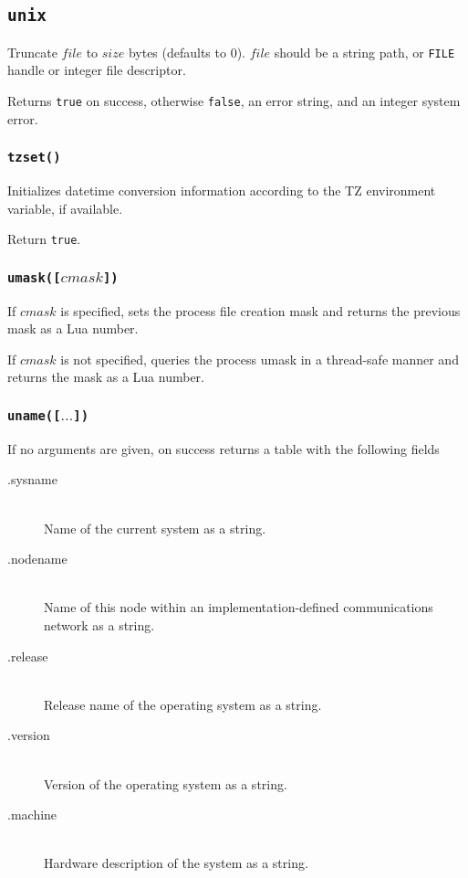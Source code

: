 \documentclass[11pt, oneside]{memoir}
\newcommand*{\true}[0]{\texttt{true}\xspace}
\newcommand*{\false}[0]{\texttt{false}\xspace}
\newcommand*{\fn}[1]{\texttt{#1}\xspace}
\newcommand*{\const}[1]{\texttt{#1}\xspace}
\newcounter{toccols}
\newenvironment{Module}[1]{
	\subsection{\texttt{#1}}
	\addtocontents{toc}{
		\protect\begin{multicols}{\value{toccols}}
	}
}{
	\addtocontents{toc}{\protect\end{multicols}}
}
\begin{document}
\begin{Module}{unix}
Truncate $file$ to $size$ bytes (defaults to 0). $file$ should be a string path, or \const{FILE} handle or integer file descriptor.

Returns \true on success, otherwise \false, an error string, and an integer system error. 

\subsubsection[\fn{tzset}]{\fn{tzset()}}

Initializes datetime conversion information according to the TZ environment variable, if available.

Return \true.

\subsubsection[\fn{umask}]{\fn{umask([$cmask$])}}

If $cmask$ is specified, sets the process file creation mask and returns the previous mask as a Lua number.

If $cmask$ is not specified, queries the process umask in a thread-safe manner and returns the mask as a Lua number.

\subsubsection[\fn{uname}]{\fn{uname([$\ldots$])}}

If no arguments are given, on success returns a table with the following fields

\begin{description}
\item[.sysname] \hfill \\
Name of the current system as a string.
\item[.nodename] \hfill \\
Name of this node within an implementation-defined communications network as a string.
\item[.release] \hfill \\
Release name of the operating system as a string.
\item[.version] \hfill \\
Version of the operating system as a string.
\item[.machine] \hfill \\
Hardware description of the system as a string.
\end{description}


\end{Module}
\end{document}
